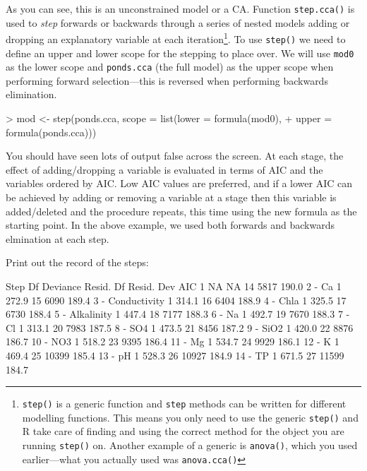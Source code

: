 \documentclass[a4paper,10pt]{article}
\newcommand{\R}{\textsf{R}\xspace}
\begin{document}
As you can see, this is an unconstrained model or a CA. Function \texttt{step.cca()} is used to \emph{step} forwards or backwards through a series of nested models adding or dropping an explanatory variable at each iteration\footnote{\texttt{step()} is a generic function and \texttt{step} methods can be written for different modelling functions. This means you only need to use the generic \texttt{step()} and \R take care of finding and using the correct method for the object you are running \texttt{step()} on. Another example of a generic is \texttt{anova()}, which you used earlier---what you actually used was \texttt{anova.cca()}}. To use \texttt{step()} we need to define an upper and lower scope for the stepping to place over. We will use \texttt{mod0} as the lower scope and \texttt{ponds.cca} (the full model) as the upper scope when performing forward selection---this is reversed when performing backwards elimination.

\begin{Schunk}
\begin{Sinput}
> mod <- step(ponds.cca, scope = list(lower = formula(mod0),
+                          upper = formula(ponds.cca)))
\end{Sinput}
\end{Schunk}

You should have seen lots of output false across the screen. At each stage, the effect of adding/dropping a variable is evaluated in terms of AIC and the variables ordered by AIC. Low AIC values are preferred, and if a lower AIC can be achieved by adding or removing a variable at a stage then this variable is added/deleted and the procedure repeats, this time using the new formula as the starting point. In the above example, we used both forwards and backwards elmination at each step.

Print out the record of the steps:

\begin{Schunk}
\begin{Soutput}
             Step Df Deviance Resid. Df Resid. Dev   AIC
1                 NA       NA        14       5817 190.0
2            - Ca  1    272.9        15       6090 189.4
3  - Conductivity  1    314.1        16       6404 188.9
4          - Chla  1    325.5        17       6730 188.4
5    - Alkalinity  1    447.4        18       7177 188.3
6            - Na  1    492.7        19       7670 188.3
7            - Cl  1    313.1        20       7983 187.5
8           - SO4  1    473.5        21       8456 187.2
9          - SiO2  1    420.0        22       8876 186.7
10          - NO3  1    518.2        23       9395 186.4
11           - Mg  1    534.7        24       9929 186.1
12            - K  1    469.4        25      10399 185.4
13           - pH  1    528.3        26      10927 184.9
14           - TP  1    671.5        27      11599 184.7
\end{Soutput}
\end{Schunk}
\end{document}
